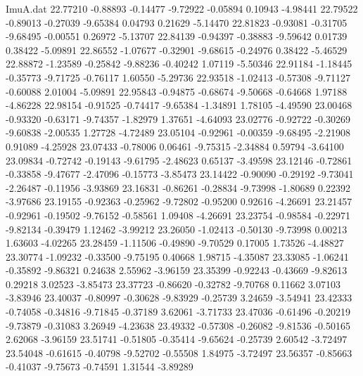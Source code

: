 \begin{filecontents}{ImuA.dat}
  22.77210   -0.88893   -0.14477   -9.72922   -0.05894    0.10943   -4.98441
  22.79522   -0.89013   -0.27039   -9.65384    0.04793    0.21629   -5.14470
  22.81823   -0.93081   -0.31705   -9.68495   -0.00551    0.26972   -5.13707
  22.84139   -0.94397   -0.38883   -9.59642    0.01739    0.38422   -5.09891
  22.86552   -1.07677   -0.32901   -9.68615   -0.24976    0.38422   -5.46529
  22.88872   -1.23589   -0.25842   -9.88236   -0.40242    1.07119   -5.50346
  22.91184   -1.18445   -0.35773   -9.71725   -0.76117    1.60550   -5.29736
  22.93518   -1.02413   -0.57308   -9.71127   -0.60088    2.01004   -5.09891
  22.95843   -0.94875   -0.68674   -9.50668   -0.64668    1.97188   -4.86228
  22.98154   -0.91525   -0.74417   -9.65384   -1.34891    1.78105   -4.49590
  23.00468   -0.93320   -0.63171   -9.74357   -1.82979    1.37651   -4.64093
  23.02776   -0.92722   -0.30269   -9.60838   -2.00535    1.27728   -4.72489
  23.05104   -0.92961   -0.00359   -9.68495   -2.21908    0.91089   -4.25928
  23.07433   -0.78006    0.06461   -9.75315   -2.34884    0.59794   -3.64100
  23.09834   -0.72742   -0.19143   -9.61795   -2.48623    0.65137   -3.49598
  23.12146   -0.72861   -0.33858   -9.47677   -2.47096   -0.15773   -3.85473
  23.14422   -0.90090   -0.29192   -9.73041   -2.26487   -0.11956   -3.93869
  23.16831   -0.86261   -0.28834   -9.73998   -1.80689    0.22392   -3.97686
  23.19155   -0.92363   -0.25962   -9.72802   -0.95200    0.92616   -4.26691
  23.21457   -0.92961   -0.19502   -9.76152   -0.58561    1.09408   -4.26691
  23.23754   -0.98584   -0.22971   -9.82134   -0.39479    1.12462   -3.99212
  23.26050   -1.02413   -0.50130   -9.73998    0.00213    1.63603   -4.02265
  23.28459   -1.11506   -0.49890   -9.70529    0.17005    1.73526   -4.48827
  23.30774   -1.09232   -0.33500   -9.75195    0.40668    1.98715   -4.35087
  23.33085   -1.06241   -0.35892   -9.86321    0.24638    2.55962   -3.96159
  23.35399   -0.92243   -0.43669   -9.82613    0.29218    3.02523   -3.85473
  23.37723   -0.86620   -0.32782   -9.70768    0.11662    3.07103   -3.83946
  23.40037   -0.80997   -0.30628   -9.83929   -0.25739    3.24659   -3.54941
  23.42333   -0.74058   -0.34816   -9.71845   -0.37189    3.62061   -3.71733
  23.47036   -0.61496   -0.20219   -9.73879   -0.31083    3.26949   -4.23638
  23.49332   -0.57308   -0.26082   -9.81536   -0.50165    2.62068   -3.96159
  23.51741   -0.51805   -0.35414   -9.65624   -0.25739    2.60542   -3.72497
  23.54048   -0.61615   -0.40798   -9.52702   -0.55508    1.84975   -3.72497
  23.56357   -0.85663   -0.41037   -9.75673   -0.74591    1.31544   -3.89289

\end{filecontents}
